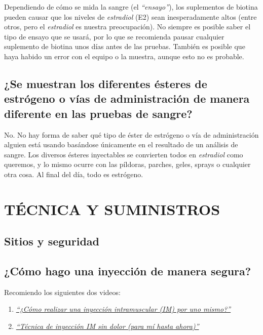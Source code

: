 \documentclass{article}
\begin{document}
Dependiendo de cómo se mida la sangre (el \textit{“ensayo”}), los suplementos de biotina pueden causar que los niveles de \textit{estradiol} (E2) sean inesperadamente altos (entre otros, pero el \textit{estradiol} es nuestra preocupación). No siempre es posible saber el tipo de ensayo que se usará, por lo que se recomienda pausar cualquier suplemento de biotina unos días antes de las pruebas. También es posible que haya habido un error con el equipo o la muestra, aunque esto no es probable.

\subsection{¿Se muestran los diferentes ésteres de estrógeno o vías de administración de manera diferente en las pruebas de sangre?}\label{4-16}

No. No hay forma de saber qué tipo de éster de estrógeno o vía de administración alguien está usando basándose únicamente en el resultado de un análisis de sangre. Los diversos ésteres inyectables se convierten todos en \textit{estradiol} como queremos, y lo mismo ocurre con las píldoras, parches, geles, sprays o cualquier otra cosa. Al final del día, todo es estrógeno.



\section{TÉCNICA Y SUMINISTROS}\label{ts}

\subsection*{Sitios y seguridad}

\subsection{¿Cómo hago una inyección de manera segura?}

Recomiendo los siguientes dos videos:

\begin{enumerate}
  \item \href{https://www.youtube.com/watch?v=cBabaGC2Dok}{\textit{“¿Cómo realizar una inyección intramuscular (IM) por uno mismo?”}}
  \item \href{https://www.youtube.com/watch?v=YfNlAZLxLyw}{\textit{“Técnica de inyección IM sin dolor (para mí hasta ahora)”}}
\end{enumerate}
\end{document}
